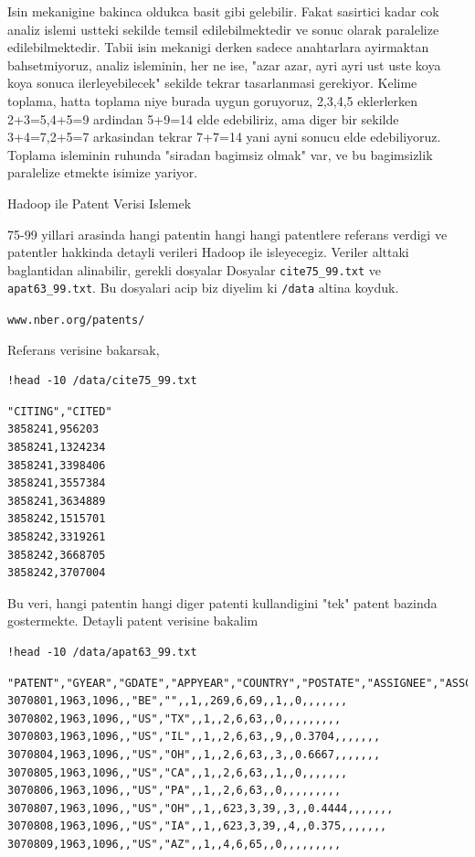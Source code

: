 \documentclass[12pt,fleqn]{article}\usepackage{../common}
\begin{document}
Isin mekanigine bakinca oldukca basit gibi gelebilir. Fakat sasirtici kadar
cok analiz islemi ustteki sekilde temsil edilebilmektedir ve sonuc olarak
paralelize edilebilmektedir. Tabii isin mekanigi derken sadece anahtarlara
ayirmaktan bahsetmiyoruz, analiz isleminin, her ne ise, "azar azar, ayri
ayri ust uste koya koya sonuca ilerleyebilecek" sekilde tekrar tasarlanmasi
gerekiyor. Kelime toplama, hatta toplama niye burada uygun goruyoruz,
2,3,4,5 eklerlerken 2+3=5,4+5=9 ardindan 5+9=14 elde edebiliriz, ama diger
bir sekilde 3+4=7,2+5=7 arkasindan tekrar 7+7=14 yani ayni sonucu elde
edebiliyoruz. Toplama isleminin ruhunda "siradan bagimsiz olmak" var, ve bu
bagimsizlik paralelize etmekte isimize yariyor.

Hadoop ile Patent Verisi Islemek

75-99 yillari arasinda hangi patentin hangi hangi patentlere referans
verdigi ve patentler hakkinda detayli verileri Hadoop ile
isleyecegiz. Veriler alttaki baglantidan alinabilir, gerekli dosyalar
Dosyalar \verb!cite75_99.txt! ve \verb!apat63_99.txt!. Bu dosyalari
acip biz diyelim ki \verb!/data! altina koyduk. 

\verb!www.nber.org/patents/!

Referans verisine bakarsak,

\begin{verbatim}
!head -10 /data/cite75_99.txt
\end{verbatim}

\begin{verbatim}
"CITING","CITED"
3858241,956203
3858241,1324234
3858241,3398406
3858241,3557384
3858241,3634889
3858242,1515701
3858242,3319261
3858242,3668705
3858242,3707004
\end{verbatim}

Bu veri, hangi patentin hangi diger patenti kullandigini "tek" patent
bazinda gostermekte. Detayli patent verisine bakalim

\begin{verbatim}
!head -10 /data/apat63_99.txt
\end{verbatim}

\begin{verbatim}
"PATENT","GYEAR","GDATE","APPYEAR","COUNTRY","POSTATE","ASSIGNEE","ASSCODE","CLAIMS","NCLASS","CAT","SUBCAT","CMADE","CRECEIVE","RATIOCIT","GENERAL","ORIGINAL","FWDAPLAG","BCKGTLAG","SELFCTUB","SELFCTLB","SECDUPBD","SECDLWBD"
3070801,1963,1096,,"BE","",,1,,269,6,69,,1,,0,,,,,,,
3070802,1963,1096,,"US","TX",,1,,2,6,63,,0,,,,,,,,,
3070803,1963,1096,,"US","IL",,1,,2,6,63,,9,,0.3704,,,,,,,
3070804,1963,1096,,"US","OH",,1,,2,6,63,,3,,0.6667,,,,,,,
3070805,1963,1096,,"US","CA",,1,,2,6,63,,1,,0,,,,,,,
3070806,1963,1096,,"US","PA",,1,,2,6,63,,0,,,,,,,,,
3070807,1963,1096,,"US","OH",,1,,623,3,39,,3,,0.4444,,,,,,,
3070808,1963,1096,,"US","IA",,1,,623,3,39,,4,,0.375,,,,,,,
3070809,1963,1096,,"US","AZ",,1,,4,6,65,,0,,,,,,,,,
\end{verbatim}
\end{document}
